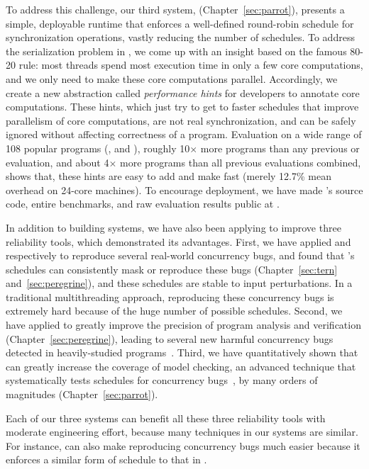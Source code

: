 To address this challenge, our third \smt system, \parrot 
(Chapter~\ref{sec:parrot}), presents a simple, deployable runtime that enforces 
a well-defined round-robin schedule for synchronization operations, vastly 
reducing the number of schedules. To address the serialization problem in \smt, 
we come up with an insight based on the famous 80-20 rule: most threads spend 
most execution time in only a few core computations, and we only need to make 
these core computations parallel. Accordingly, we create a new abstraction 
called \emph{performance hints} for developers to annotate core computations. 
These hints, which just try to get to faster schedules that improve parallelism 
of core computations, are not real synchronization, and can be safely ignored 
without affecting correctness of a program. Evaluation on a wide range of 108 
popular programs (\eg, \bdb and \mplayer), roughly 10$\times$ more programs 
than any previous \smt or \dmt evaluation, and about 4$\times$ more programs 
than all previous evaluations combined, shows that, these hints are easy to add 
and make \parrot fast (merely 12.7\% mean overhead on 24-core machines). To 
encourage \smt deployment, we have made \parrot's source code, entire 
benchmarks, and raw evaluation results public at \github.

In addition to building \smt systems, we have also been applying \smt to 
improve three reliability tools, which demonstrated its advantages. First, we 
have applied \tern and \peregrine respectively to reproduce several 
real-world concurrency bugs, and found that \smt's schedules can consistently 
mask or reproduce these bugs (Chapter~\ref{sec:tern} and~\ref{sec:peregrine}), 
and these schedules are stable to input perturbations. In a traditional 
multithreading approach, reproducing these concurrency bugs is extremely hard 
because of the huge number of possible schedules. Second, we have applied 
\peregrine to greatly improve the precision of program 
analysis and verification (Chapter~\ref{sec:peregrine}), leading to several 
new harmful concurrency bugs detected in heavily-studied 
programs~\cite{wu:pldi12}. Third, we have quantitatively shown that \parrot 
can greatly increase the coverage of model checking, an advanced technique that 
systematically tests schedules for concurrency bugs~\cite{parrot:sosp13, 
dbug:spin11, modist:nsdi09}, by many orders of magnitudes 
(Chapter~\ref{sec:parrot}).

Each of our three \smt systems can benefit all these three reliability tools 
with moderate engineering effort, because many techniques in our \smt systems 
are similar. For instance, \parrot can also make reproducing concurrency bugs 
much easier because it enforces a similar form of schedule to that in \tern.

